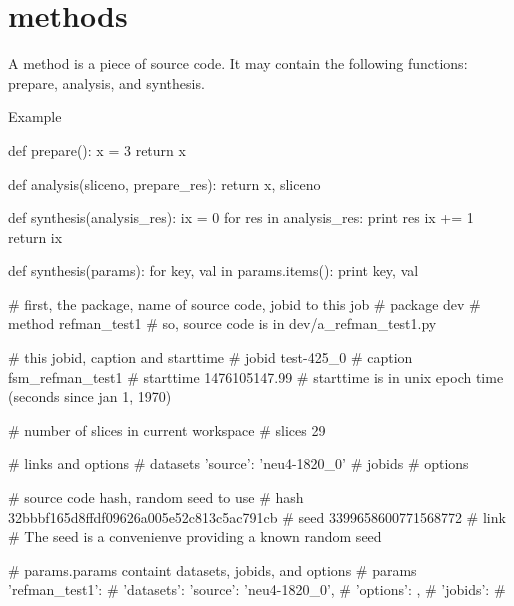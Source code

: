 \section{methods}
A method is a piece of source code.  It may contain the following
functions:  prepare, analysis, and synthesis.

Example

\begin{python}
def prepare():
  x = 3
  return x

def analysis(sliceno, prepare_res):
  return x, sliceno
  
def synthesis(analysis_res):
  ix = 0
  for res in analysis_res:
    print res
    ix += 1
  return ix
\end{python}

\begin{python}
def synthesis(params):
  for key, val in params.items():
    print key, val

# first, the package, name of source code, jobid to this job
#   package   dev
#   method    refman_test1
# so, source code is in dev/a_refman_test1.py

# this jobid, caption and starttime
#   jobid     test-425_0
#   caption   fsm_refman_test1
#   starttime 1476105147.99
# starttime is in unix epoch time (seconds since jan 1, 1970)
    
# number of slices in current workspace
#   slices    29

# links and options
#   datasets  {'source': 'neu4-1820_0'}
#   jobids    {}
#   options   {}

# source code hash, random seed to use    
#   hash      32bbbf165d8ffdf09626a005e52c813c5ac791cb
#   seed      3399658600771568772
#   link      {}
# The seed is a convenienve providing a known random seed

# params.params containt datasets, jobids, and options
#   params    {'refman_test1': {
#                'datasets': {'source': 'neu4-1820_0'},
#                'options': {},
#                'jobids': {}}
#             }
\end{python}
